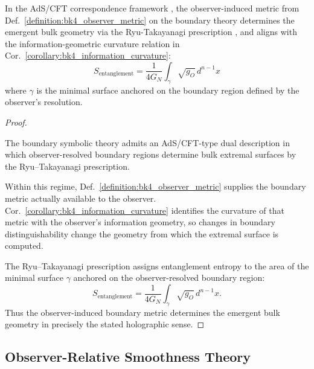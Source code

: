 \begin{proposition}\label{proposition:bk4_holographic_emergence}
In the AdS/CFT correspondence framework \cite{maldacena1998large}, the observer-induced metric from Def.~\ref{definition:bk4_observer_metric} on the boundary theory determines the emergent bulk geometry via the Ryu-Takayanagi prescription \cite{ryu2006holographic}, and aligns with the information-geometric curvature relation in Cor.~\ref{corollary:bk4_information_curvature}:
\begin{equation}
    S_{\text{entanglement}} = \frac{1}{4G_N} \int_{\gamma} \sqrt{g_O} \, d^{n-1}x
\end{equation}
where $\gamma$ is the minimal surface anchored on the boundary region defined by the observer's resolution.
\end{proposition}

\begin{proof}
\label{proof:bk4_holographic_emergence}
\leavevmode

\begin{assumption}
The boundary symbolic theory admits an AdS/CFT-type dual description in which
observer-resolved boundary regions determine bulk extremal surfaces by the
Ryu--Takayanagi prescription.
\end{assumption}

Within this regime, Def.~\ref{definition:bk4_observer_metric} supplies the
boundary metric actually available to the observer. Cor.~\ref{corollary:bk4_information_curvature}
identifies the curvature of that metric with the observer's information
geometry, so changes in boundary distinguishability change the geometry from
which the extremal surface is computed.

The Ryu--Takayanagi prescription assigns entanglement entropy to the area of
the minimal surface $\gamma$ anchored on the observer-resolved boundary region:
\[
S_{\mathrm{entanglement}}
 =
\frac{1}{4G_N}\int_\gamma\sqrt{g_O}\,d^{n-1}x.
\]
Thus the observer-induced boundary metric determines the emergent bulk
geometry in precisely the stated holographic sense.
\end{proof}

\subsection{Observer-Relative Smoothness Theory}

